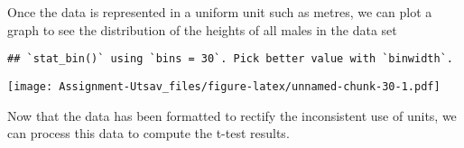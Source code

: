 \documentclass[
]{article}
\newenvironment{Shaded}{\begin{snugshade}}{\end{snugshade}}
\newcommand{\DataTypeTok}[1]{\textcolor[rgb]{0.13,0.29,0.53}{#1}}
\newcommand{\DecValTok}[1]{\textcolor[rgb]{0.00,0.00,0.81}{#1}}
\newcommand{\FloatTok}[1]{\textcolor[rgb]{0.00,0.00,0.81}{#1}}
\newcommand{\KeywordTok}[1]{\textcolor[rgb]{0.13,0.29,0.53}{\textbf{#1}}}
\newcommand{\NormalTok}[1]{#1}
\newcommand{\OperatorTok}[1]{\textcolor[rgb]{0.81,0.36,0.00}{\textbf{#1}}}
\newcommand{\OtherTok}[1]{\textcolor[rgb]{0.56,0.35,0.01}{#1}}
\newcommand{\StringTok}[1]{\textcolor[rgb]{0.31,0.60,0.02}{#1}}
\begin{document}
\begin{Shaded}
\end{Shaded}

Once the data is represented in a uniform unit such as metres, we can
plot a graph to see the distribution of the heights of all males in the
data set

\begin{Shaded}
\end{Shaded}

\begin{verbatim}
## `stat_bin()` using `bins = 30`. Pick better value with `binwidth`.
\end{verbatim}

\texttt{[image: Assignment-Utsav\_files/figure-latex/unnamed-chunk-30-1.pdf]}

Now that the data has been formatted to rectify the inconsistent use of
units, we can process this data to compute the t-test results.

\begin{Shaded}
\end{Shaded}
\end{document}
